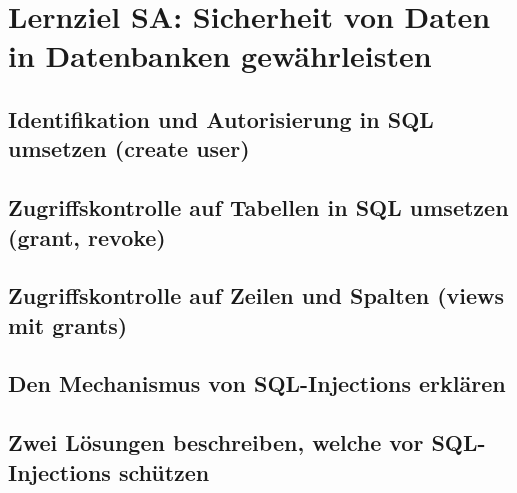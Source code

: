 \section{Lernziel SA: Sicherheit von Daten in Datenbanken gewährleisten}

\subsection{Identifikation und Autorisierung in SQL umsetzen (create user)}

\subsection{Zugriffskontrolle auf Tabellen in SQL umsetzen (grant, revoke)}

\subsection{Zugriffskontrolle auf Zeilen und Spalten (views mit grants)}

\subsection{Den Mechanismus von SQL-Injections erklären}

\subsection{Zwei Lösungen beschreiben, welche vor SQL-Injections schützen}